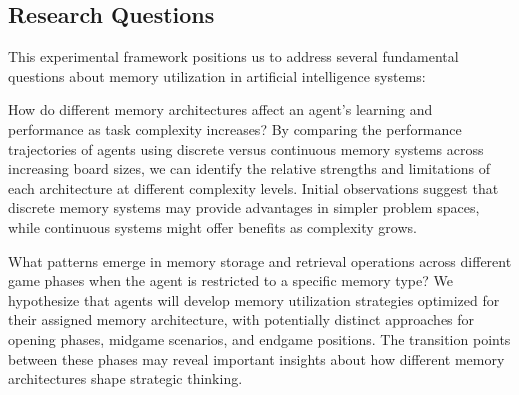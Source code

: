 \documentclass{article}
\begin{document}



\subsection{Research Questions}

This experimental framework positions us to address several fundamental questions about memory utilization in artificial intelligence systems:

How do different memory architectures affect an agent's learning and performance as task complexity increases? By comparing the performance trajectories of agents using discrete versus continuous memory systems across increasing board sizes, we can identify the relative strengths and limitations of each architecture at different complexity levels. Initial observations suggest that discrete memory systems may provide advantages in simpler problem spaces, while continuous systems might offer benefits as complexity grows.

What patterns emerge in memory storage and retrieval operations across different game phases when the agent is restricted to a specific memory type? We hypothesize that agents will develop memory utilization strategies optimized for their assigned memory architecture, with potentially distinct approaches for opening phases, midgame scenarios, and endgame positions. The transition points between these phases may reveal important insights about how different memory architectures shape strategic thinking.
\end{document}
